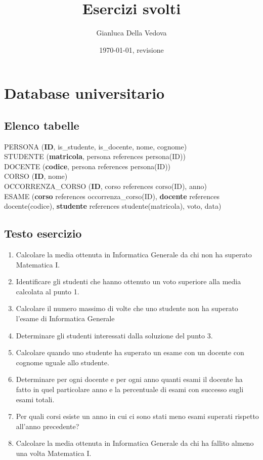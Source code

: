 \documentclass[11pt]{article}
\title{Esercizi svolti}
\author{Gianluca Della Vedova}
\date{\today, {\tiny revisione \VCRevision}}
\begin{document}
\section{Database universitario}

\subsection{Elenco tabelle}

\noindent
PERSONA (\textbf{ID}, is\_studente, is\_docente, nome, cognome)\\
STUDENTE (\textbf{matricola}, persona references persona(ID))\\
DOCENTE (\textbf{codice}, persona references persona(ID))\\
CORSO (\textbf{ID}, nome)\\
OCCORRENZA\_CORSO (\textbf{ID}, corso references corso(ID), anno)\\
ESAME (\textbf{corso} references occorrenza\_corso(ID), \textbf{docente} references
docente(codice), \textbf{studente} references studente(matricola), voto, data)

\subsection{Testo esercizio}

\begin{enumerate}
\item
Calcolare la media ottenuta in Informatica Generale da chi non ha superato Matematica I.
\item
Identificare gli studenti che hanno ottenuto un voto superiore alla media calcolata al
punto 1.
\item
Calcolare il numero massimo di volte che uno studente non ha superato l'esame di
Informatica Generale
\item
Determinare gli studenti interessati dalla soluzione del punto 3.
\item
Calcolare quando uno studente ha superato un esame con un docente con cognome uguale allo
studente.
\item
Determinare per ogni docente e per ogni anno quanti esami il docente ha fatto
in
quel particolare anno e  la percentuale di esami con successo sugli esami
totali.
\item
Per quali corsi esiste un anno in cui ci sono stati meno esami superati
rispetto
all'anno precedente?
\item
Calcolare la media ottenuta in Informatica Generale da chi ha fallito almeno
una volta Matematica I.
\end{enumerate}
\end{document}
